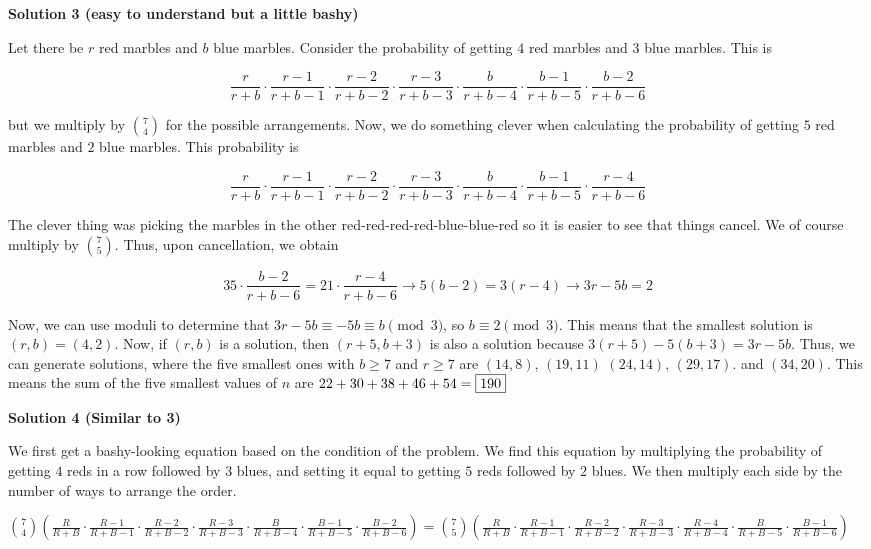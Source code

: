 \begin{enumerate}
 



\textbf{Solution 3 (easy to understand but a little bashy)}

Let there be $r$ red marbles and $b$ blue marbles. Consider the probability of getting $4$ red marbles and $3$ blue marbles. This is

 
 \[\frac{r}{r+b} \cdot \frac{r-1}{r+b-1} \cdot \frac{r-2}{r+b-2} \cdot \frac{r-3}{r+b-3} \cdot \frac{b}{r+b-4} \cdot \frac{b-1}{r+b-5} \cdot \frac{b-2}{r+b-6}\]

 but we multiply by $\binom{7}{4}$ for the possible arrangements. Now, we do something clever when calculating the probability of getting $5$ red marbles and $2$ blue marbles. This probability is 

 
 \[\frac{r}{r+b} \cdot \frac{r-1}{r+b-1} \cdot \frac{r-2}{r+b-2} \cdot \frac{r-3}{r+b-3} \cdot \frac{b}{r+b-4} \cdot \frac{b-1}{r+b-5} \cdot \frac{r-4}{r+b-6}\]

 The clever thing was picking the marbles in the other red-red-red-red-blue-blue-red so it is easier to see that things cancel. We of course multiply by $\binom{7}{5}$. Thus, upon cancellation, we obtain

 
 \[35 \cdot \frac{b-2}{r+b-6} = 21 \cdot \frac{r-4}{r+b-6} \rightarrow 5(b-2)=3(r-4) \rightarrow 3r-5b=2\]

 Now, we can use moduli to determine that $3r-5b \equiv -5b \equiv b \pmod{3}$, so $b \equiv 2 \pmod{3}$. This means that the smallest solution is $(r, b)=(4, 2)$. Now, if $(r, b)$ is a solution, then $(r+5, b+3)$ is also a solution because $3(r+5)-5(b+3)=3r-5b$. Thus, we can generate solutions, where the five smallest ones with $b \ge 7$ and $r \ge 7$ are $(14, 8)$, $(19, 11)$ $(24, 14)$, $(29, 17)$. and $(34, 20)$. This means the sum of the five smallest values of $n$ are $22+30+38+46+54=\fbox{190}$




\textbf{Solution 4 (Similar to 3)}

We first get a bashy-looking equation based on the condition of the problem. We find this equation by multiplying the probability of getting $4$ reds in a row followed by $3$ blues, and setting it equal to getting $5$ reds followed by $2$ blues. We then multiply each side by the number of ways to arrange the order.

 $\binom{7}{4} \left( \frac{R}{R+B} \cdot \frac{R-1}{R+B-1} \cdot \frac{R-2}{R+B-2} \cdot \frac{R-3}{R+B-3} \cdot \frac{B}{R+B-4} \cdot \frac{B-1}{R+B-5} \cdot \frac{B-2}{R+B-6} \right) = \binom{7}{5} \left( \frac{R}{R+B} \cdot \frac{R-1}{R+B-1} \cdot \frac{R-2}{R+B-2} \cdot \frac{R-3}{R+B-3} \cdot \frac{R-4}{R+B-4} \cdot \frac{B}{R+B-5} \cdot \frac{B-1}{R+B-6} \right)$


\end{enumerate}
